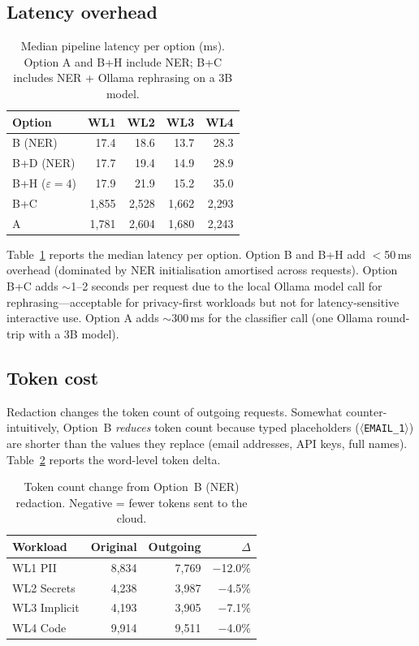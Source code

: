 \documentclass[11pt,a4paper]{article}
\begin{document}
\subsection{Latency overhead}

\begin{table}[h]
\centering
\small
\caption{Median pipeline latency per option (ms).  Option A and B+H
include NER; B+C includes NER + Ollama rephrasing on a 3B model.}
\label{tab:latency}
\begin{tabular}{lrrrr}
\toprule
Option & WL1 & WL2 & WL3 & WL4 \\
\midrule
B (NER)     & 17.4  & 18.6  & 13.7  & 28.3 \\
B+D (NER)   & 17.7  & 19.4  & 14.9  & 28.9 \\
B+H ($\varepsilon\!=\!4$) & 17.9 & 21.9 & 15.2 & 35.0 \\
B+C         & 1{,}855 & 2{,}528 & 1{,}662 & 2{,}293 \\
A           & 1{,}781 & 2{,}604 & 1{,}680 & 2{,}243 \\
\bottomrule
\end{tabular}
\end{table}

Table~\ref{tab:latency} reports the median latency per option.
Option B and B+H add $<$50\,ms overhead (dominated by NER
initialisation amortised across requests).  Option B+C adds
$\sim$1--2 seconds per request due to the local Ollama model call
for rephrasing---acceptable for privacy-first workloads but not
for latency-sensitive interactive use.  Option A adds $\sim$300\,ms
for the classifier call (one Ollama round-trip with a 3B model).

\subsection{Token cost}

Redaction changes the token count of outgoing requests.
Somewhat counter-intuitively, Option~B \emph{reduces} token
count because typed placeholders
(\texttt{$\langle$EMAIL\_1$\rangle$})
are shorter than the values they replace (email addresses,
API keys, full names).  Table~\ref{tab:cost} reports the
word-level token delta.

\begin{table}[h]
\centering
\small
\caption{Token count change from Option~B (NER) redaction.
  Negative = fewer tokens sent to the cloud.}
\label{tab:cost}
\begin{tabular}{lrrr}
\toprule
Workload & Original & Outgoing & $\Delta$ \\
\midrule
WL1 PII      & 8{,}834 & 7{,}769 & $-$12.0\% \\
WL2 Secrets  & 4{,}238 & 3{,}987 & $-$4.5\% \\
WL3 Implicit & 4{,}193 & 3{,}905 & $-$7.1\% \\
WL4 Code     & 9{,}914 & 9{,}511 & $-$4.0\% \\
\bottomrule
\end{tabular}
\end{table}
\end{document}
